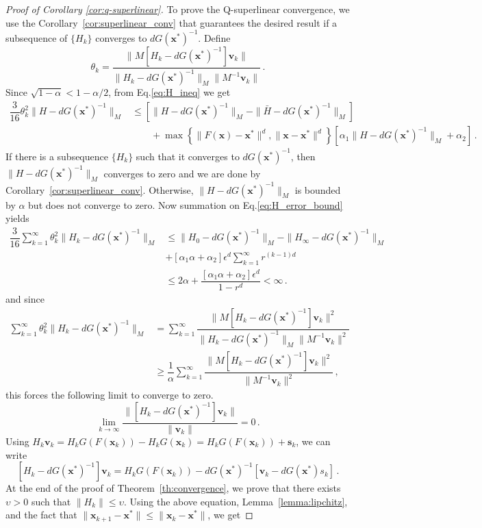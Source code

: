 \documentclass{statsoc}
\newcommand{\bs}{\boldsymbol{s}}
\newcommand{\bv}{\boldsymbol{v}}
\newcommand{\bx}{\boldsymbol{x}}
\begin{document}
\begin{proof}[Proof of Corollary \ref{cor:q-superlinear}]

To prove the Q-superlinear convergence, we use the Corollary~\ref{cor:superlinear_conv} that guarantees the desired result if a subsequence of $\{H_k\}$ converges to $dG(\bx^\ast)^{-1}$. Define
\[
\theta_k = \dfrac{\|M[H_k - dG(\bx^\ast)^{-1}]\bv_k\|}{\|H_k - dG(\bx^\ast)^{-1}\|_M\|M^{-1}\bv_k\|}\,.
\]
Since $\sqrt{1 - \alpha} < 1 - \alpha/2$, from Eq.\eqref{eq:H_ineq} we get
\begin{align} \label{eq:H_error_bound} 
    \dfrac{3}{16}\theta_k^2\|H - dG(\bx^\ast)^{-1}\|_M &\leq \left[\|H - dG(\bx^\ast)^{-1}\|_M - \|\bar{H} - dG(\bx^\ast)^{-1}\|_M\right] \nonumber \\
    & \qquad + \max\left\{\|F(\bx) - \bx^\ast\|^d, \|\bx-\bx^\ast\|^d\right\}[\alpha_1\|H - dG(\bx^\ast)^{-1}\|_M + \alpha_2]\,.
\end{align}
If there is a subsequence $\{H_k\}$ such that it converges to $dG(\bx^\ast)^{-1}$, then $\|H - dG(\bx^\ast)^{-1}\|_M$ converges to zero and we are done by Corollary~\ref{cor:superlinear_conv}. Otherwise, $\|H - dG(\bx^\ast)^{-1}\|_M$ is bounded by $\alpha$ but does not converge to zero. 
Now summation on Eq.\eqref{eq:H_error_bound} yields
\begin{align*}
    \dfrac{3}{16}\sum_{k=1}^{\infty}\theta_k^2\|H_k - dG(\bx^\ast)^{-1}\|_M &\leq \|H_0 - dG(\bx^\ast)^{-1}\|_M  - \|H_{\infty} - dG(\bx^\ast)^{-1}\|_M\\
    &+  [\alpha_1 \alpha + \alpha_2]\epsilon^d \sum_{k=1}^{\infty} r^{(k-1)d}\\
    &\leq 2\alpha + \dfrac{[\alpha_1 \alpha + \alpha_2]\epsilon^d}{1 - r^d} < \infty\,.
\end{align*}
and since
\begin{align*}
    \sum_{k=1}^{\infty}\theta_k^2\|H_k - dG(\bx^\ast)^{-1}\|_M &= \sum_{k=1}^{\infty}\dfrac{\|M[H_k - dG(\bx^\ast)^{-1}]\bv_k\|^2}{\|H_k - dG(\bx^\ast)^{-1}\|_M\|M^{-1}\bv_k\|^2}\\
    &\geq \dfrac{1}{\alpha} \sum_{k=1}^{\infty}\dfrac{\|M[H_k - dG(\bx^\ast)^{-1}]\bv_k\|^2}{\|M^{-1}\bv_k\|^2}\,,
\end{align*}
 this forces the following limit to converge to zero. 
\begin{equation} \label{eq:lim_(H-G'y)/(y)}
\lim_{k \to \infty}\dfrac{\|[H_k - dG(\bx^\ast)^{-1}]\bv_k\|}{\|\bv_k\|} = 0\,.
\end{equation}
Using $H_k \bv_k = H_k G(F(\bx_k)) - H_k G(\bx_k) = H_k G(F(\bx_k)) + \bs_k$, we can write
\[
[H_k - dG(\bx^\ast)^{-1}]\bv_k = H_k G(F(\bx_{k})) - dG(\bx^\ast)^{-1}[\bv_k - dG(\bx^\ast)s_k]\,.
\]
At the end of the proof of Theorem~\ref{th:convergence}, we prove that there exists $\upsilon > 0$ such that $\|H_k\| \leq \upsilon$. Using the above equation, Lemma~\ref{lemma:lipchitz}, and the fact that $\|\bx_{k+1} - \bx^\ast\| \leq \|\bx_k - \bx^\ast\|$, we get


\end{proof}
\end{document}
